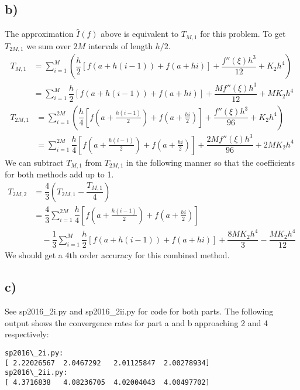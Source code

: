 \documentclass[12pt]{article}
\begin{document}
\subsection*{b)}
The approximation $\hat{I}(f)$ above is equivalent to $T_{M,1}$ for this problem. To get $T_{2M,1}$ we sum over $2M$ intervals of length $h/2$.
\begin{equation*}
\begin{split}
T_{M,1} &= \sum_{i=1}^{M} \left( \dfrac{h}{2} \left[f(a+h(i-1)) + f(a+hi)\right] + \dfrac{f''(\xi)h^3}{12} + K_2h^4 \right) \\
&= \sum_{i=1}^{M} \dfrac{h}{2} \left[f(a+h(i-1)) + f(a+hi)\right] + \dfrac{Mf''(\xi)h^3}{12} + MK_2h^4
\end{split}
\end{equation*}
\begin{equation*}
\begin{split}
T_{2M,1} &= \sum_{i=1}^{2M} \left( \dfrac{h}{4} \left[f(a+\frac{h(i-1)}{2}) + f(a+\frac{hi}{2})\right] + \dfrac{f''(\xi)h^3}{96} + K_2h^4 \right) \\
&= \sum_{i=1}^{2M} \dfrac{h}{4} \left[f(a+\frac{h(i-1)}{2}) + f(a+\frac{hi}{2})\right] + \dfrac{2Mf''(\xi)h^3}{96} + 2MK_2h^4
\end{split}
\end{equation*}
We can subtract $T_{M,1}$ from $T_{2M,1}$ in the following manner so that the coefficients for both methods add up to 1.
\begin{equation*}
\begin{split}
T_{2M,2} &= \dfrac{4}{3} \left( T_{2M,1}-\dfrac{T_{M,1}}{4} \right) \\
&= \dfrac{4}{3} \sum_{i=1}^{2M} \dfrac{h}{4} \left[f(a+\frac{h(i-1)}{2}) + f(a+\frac{hi}{2})\right] \\ &\hspace{1em} - \dfrac{1}{3} \sum_{i=1}^{M} \dfrac{h}{2} \left[f(a+h(i-1)) + f(a+hi)\right] + \dfrac{8MK_2h^4}{3} - \dfrac{MK_2h^4}{12}
\end{split}
\end{equation*}
We should get a 4th order accuracy for this combined method.

\subsection*{c)}
See sp2016\_2i.py and sp2016\_2ii.py for code for both parts.
The following output shows the convergence rates for part a and b approaching 2 and 4 respectively:
\begin{lstlisting}
sp2016\_2i.py:
[ 2.22026567  2.0467292   2.01125847  2.00278934]
sp2016\_2ii.py:
[ 4.3716838   4.08236705  4.02004043  4.00497702]
\end{lstlisting}
\end{document}
